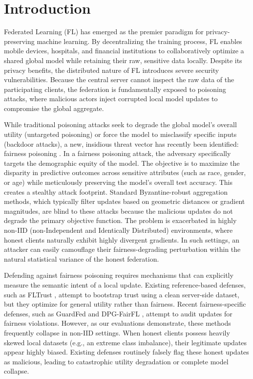 \documentclass[journal]{IEEEtran}
\begin{document}
\section{Introduction}
Federated Learning (FL) \cite{mcmahan2017communication} has emerged as the premier paradigm for privacy-preserving machine learning. By decentralizing the training process, FL enables mobile devices, hospitals, and financial institutions to collaboratively optimize a shared global model while retaining their raw, sensitive data locally. Despite its privacy benefits, the distributed nature of FL introduces severe security vulnerabilities. Because the central server cannot inspect the raw data of the participating clients, the federation is fundamentally exposed to poisoning attacks, where malicious actors inject corrupted local model updates to compromise the global aggregate. 

While traditional poisoning attacks seek to degrade the global model's overall utility (untargeted poisoning) or force the model to misclassify specific inputs (backdoor attacks), a new, insidious threat vector has recently been identified: fairness poisoning \cite{lorafl2024}. In a fairness poisoning attack, the adversary specifically targets the demographic equity of the model. The objective is to maximize the disparity in predictive outcomes across sensitive attributes (such as race, gender, or age) while meticulously preserving the model's overall test accuracy. This creates a stealthy attack footprint. Standard Byzantine-robust aggregation methods, which typically filter updates based on geometric distances or gradient magnitudes, are blind to these attacks because the malicious updates do not degrade the primary objective function. The problem is exacerbated in highly non-IID (non-Independent and Identically Distributed) environments, where honest clients naturally exhibit highly divergent gradients. In such settings, an attacker can easily camouflage their fairness-degrading perturbation within the natural statistical variance of the honest federation.

Defending against fairness poisoning requires mechanisms that can explicitly measure the semantic intent of a local update. Existing reference-based defenses, such as FLTrust \cite{cao2021fltrust}, attempt to bootstrap trust using a clean server-side dataset, but they optimize for general utility rather than fairness. Recent fairness-specific defenses, such as GuardFed \cite{guardfed2024} and DPG-FairFL \cite{dpgfairfl2025}, attempt to audit updates for fairness violations. However, as our evaluations demonstrate, these methods frequently collapse in non-IID settings. When honest clients possess heavily skewed local datasets (e.g., an extreme class imbalance), their legitimate updates appear highly biased. Existing defenses routinely falsely flag these honest updates as malicious, leading to catastrophic utility degradation or complete model collapse.
\end{document}

